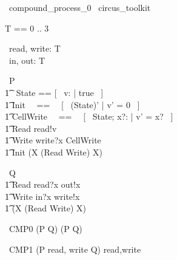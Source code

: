 \begin{zsection}
  \SECTION\ compound\_process\_0 \parents\ circus\_toolkit
\end{zsection}

\begin{zed}
	T == 0 .. 3 
\end{zed}

\begin{circus}
	\circchannel\ read, write: T \\
	\circchannel\ in, out: T \\
\end{circus}

\begin{circus}
    \circprocess\ P \circdef \circbegin \\
        \t1 \circstate\ State == [~ v: \nat | true ~] \\
        \t1 Init ~~==~~ [~ (State)' | v' = 0 ~] \\
        \t1 CellWrite ~~==~~ [~ \Delta State; x?: \nat | v' = x? ~] \\
        \t1 Read \circdef read!v \then \Skip \\
        \t1 Write \circdef write?x \then \lschexpract CellWrite \rschexpract \\
        \t1 \circspot \lschexpract Init \rschexpract \circseq (\circmu X \circspot (Read \extchoice Write) \circseq X) \\ 
	\circend
\end{circus}

\begin{circus}
    \circprocess\ Q \circdef \circbegin \\
        \t1 Read \circdef read?x \then out!x \then \Skip \\
        \t1 Write \circdef in?x \then write!x \then \Skip \\
        \t1 \circspot (\circmu X \circspot (Read \extchoice Write) \circseq X) \\ 
	\circend
\end{circus}

\begin{circus}
    \circprocess\ CMP0 \circdef (P \circseq Q) \extchoice (P \intchoice Q)\\
\end{circus}

\begin{circus}
    \circprocess\ CMP1 \circdef (P \lpar \lchanset read, write \rchanset \rpar Q) \circhide \lchanset read,write \rchanset \\
\end{circus}
